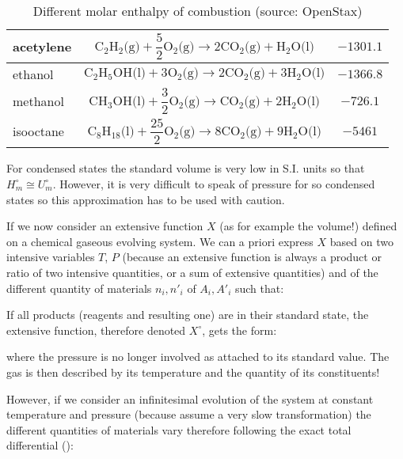 \begin{enumerate}
\begin{table}[H]
{\begin{tabular}{|l|c|c|}
			acetylene & $\mathrm{C}_2\mathrm{H}_2\text{(g)}+\dfrac{5}{2}\mathrm{O}_2\text{(g)}\rightarrow 2\mathrm{CO}_2\text{(g)}+\mathrm{H}_2\mathrm{O}\text{(l)}$ & $-1301.1$ \\ \hline
			ethanol & $\mathrm{C}_2\mathrm{H}_5\mathrm{OH}\text{(l)}+3\mathrm{O}_2\text{(g)}\rightarrow 2\mathrm{CO}_2\text{(g)}+3\mathrm{H}_2\mathrm{O}\text{(l)}$ & $-1366.8$ \\ \hline
			methanol & $\mathrm{CH}_3\mathrm{OH}\text{(l)}+\dfrac{3}{2}\mathrm{O}_2\text{(g)}\rightarrow \mathrm{CO}_2\text{(g)}+2\mathrm{H}_2\mathrm{O}\text{(l)}$ & $-726.1$ \\ \hline
			isooctane & $\mathrm{C}_8\mathrm{H}_{18}\text{(l)}+\dfrac{25}{2}\mathrm{O}_2\text{(g)}\rightarrow 8\mathrm{CO}_2\text{(g)}+9\mathrm{H}_2\mathrm{O}\text{(l)}$ & $-5461$ \\ \hline
			\end{tabular}}
			\caption[Different molar enthalpy of combustion]{Different molar enthalpy of combustion (source: OpenStax)}
		\end{table}
	\end{enumerate}
	\begin{tcolorbox}[title=Remark,colframe=black,arc=10pt]
	For condensed states the standard volume is very low in S.I. units so that $H_m^\circ\cong U_m^\circ$. However, it is very difficult to speak of pressure for so condensed states so this approximation has to be used with caution.
	\end{tcolorbox}	
	If we now consider an extensive function $X$ (as for example the volume!) defined on a chemical gaseous evolving system. We can a priori express $X$ based on two intensive variables $T$, $P$ (because an extensive function is always a product or ratio of two intensive quantities, or a sum of extensive quantities) and of the different quantity of materials $n_i,{n'}_i$ of $A_i,{A'}_i$ such that:
	
	If all products (reagents and resulting one) are in their standard state, the extensive function, therefore denoted $X^\circ$, gets the form:
	
	where the pressure is no longer involved as attached to its standard value. The gas is then described by its temperature and the quantity of its constituents!
	
	However, if we consider an infinitesimal evolution of the system at constant temperature and pressure (because assume a very slow transformation) the different quantities of materials vary therefore following the exact total differential ():
	
